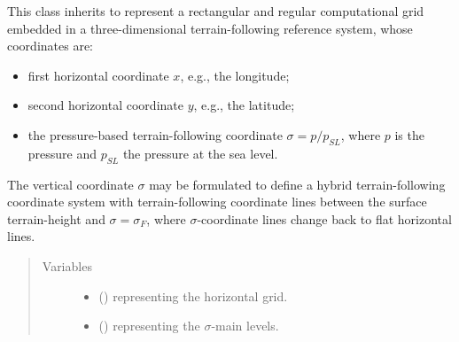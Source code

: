 \documentclass[letterpaper,10pt,english]{sphinxmanual}
\begin{document}
\begin{fulllineitems}
\label{\detokenize{api:grids.sigma.Sigma3d}}
This class inherits {\hyperref[\detokenize{api:grids.grid_xyz.GridXYZ}]{}} to represent a rectangular and regular computational grid
embedded in a three-dimensional terrain-following reference system, whose coordinates are:
\begin{itemize}
\item {} 
first horizontal coordinate \(x\), e.g., the longitude;

\item {} 
second horizontal coordinate \(y\), e.g., the latitude;

\item {} 
the pressure-based terrain-following coordinate \(\sigma = p / p_{SL}\),                  where \(p\) is the pressure and \(p_{SL}\) the pressure at the sea level.

\end{itemize}

The vertical coordinate \(\sigma\) may be formulated to define a hybrid terrain-following coordinate system
with terrain-following coordinate lines between the surface terrain-height and \(\sigma = \sigma_F\), where
\(\sigma\)-coordinate lines change back to flat horizontal lines.
\begin{quote}\begin{description}
\item[{Variables}] \leavevmode\begin{itemize}
\item {} 
 () \textendash{} {\hyperref[\detokenize{api:grids.grid_xy.GridXY}]{}} representing the horizontal grid.

\item {} 
 () \textendash{} {\hyperref[\detokenize{api:grids.axis.Axis}]{}} representing the \(\sigma\)-main levels.


\end{itemize}
\end{description}
\end{quote}
\end{fulllineitems}
\end{document}
